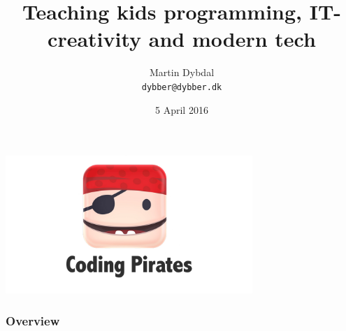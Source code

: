 \documentclass{beamer}
\title[Coding Pirates] %
  {Teaching kids programming, IT-creativity and modern tech} %
\author{\footnotesize{Martin Dybdal} \\ \footnotesize{\texttt{dybber@dybber.dk}}}
\institute {
DIKU \\
University of Copenhagen
}
\date{5 April 2016}
\begin{document}
{
\begin{frame}
  \begin{center}
    \includegraphics[width=0.7\textwidth]{imagery/codingpirates.png}
  \end{center}
\vspace{-1cm}
\titlepage
\end{frame}
}


\begin{frame}
\frametitle{Overview}
\tableofcontents
\end{frame}

\end{document}
